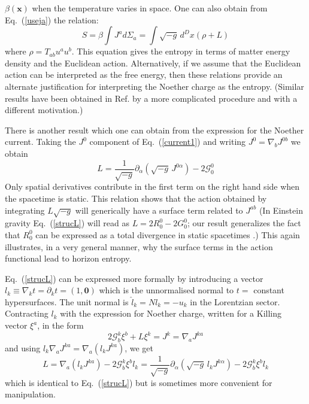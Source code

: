 \documentclass[12pt]{iopart}
\def\eq#1{{Eq.~(\ref{#1})}}
\begin{document}
$\beta (\mathbf{x})$ when the temperature varies in space. One can also obtain from \eq{useja} the  relation:
\begin{equation}
S = \beta \int J^a d \Sigma_a =  \int \sqrt{-g}\, d^Dx (\rho+L ) 
\end{equation} 
where $\rho= T_{ab} u^a u^b$.  This equation gives the entropy in terms of matter energy
density and the Euclidean action. 
Alternatively, if we assume that the Euclidean action can be interpreted as 
the free energy, then these relations  provide an alternate justification
for interpreting the Noether charge as the entropy.
(Similar results have been obtained in 
Ref. \cite{mattdbh} by a more complicated procedure and with a different motivation.)

There is another result which one can obtain from the expression for the Noether current. Taking the $J^0$ component of \eq{current1} and writing $J^0 = \nabla_b J^{0b}$
we obtain 
\begin{equation}
L = \frac{1}{\sqrt{-g}} \partial_\alpha \left( \sqrt{-g}\, J^{0\alpha}\right) - 2 \mathcal{G}^0_0
\label{strucL}
\end{equation} 
Only spatial derivatives contribute in the first term on the right hand side when the 
spacetime is static. This relation shows that the action obtained by integrating $L\sqrt{-g}$ will generically have a surface term related to $J^{ab}$ (In Einstein gravity \eq{strucL} will read as $L=2R^0_0-2G^0_0$; our result generalizes the fact that $R^0_0$ can be expressed as a total divergence in static spacetimes \cite{TPbrazil05}.) This again illustrates, in a very general manner, why the surface terms in the action functional
lead to horizon entropy. 

\eq{strucL} can be expressed more formally by introducing a vector $l_k\equiv \nabla_k t=\partial_kt=(1,\mathbf{0})$ which is the unnormalised normal to $t=$ constant hypersurfaces. The unit normal is $\hat l_k=Nl_k=-u_k$ in the Lorentzian sector. Contracting $l_k$ with the expression for Noether charge, written for a Killing vector $\xi^a$, in the form
\begin{equation}
2\mathcal{G}^k_b\xi^b+L\xi^k=J^k=\nabla_aJ^{ka}
\end{equation} 
and using 
$
l_k\nabla_aJ^{ka}=\nabla_a(l_kJ^{ka})
$, we get
\begin{equation}
L=\nabla_a(l_kJ^{ka})-2\mathcal{G}^k_b\xi^bl_k=\frac{1}{\sqrt{-g}} \partial_\alpha \left( \sqrt{-g}\, l_kJ^{k\alpha}\right)-2\mathcal{G}^k_b\xi^bl_k
\end{equation} 
which is identical to \eq{strucL} but is sometimes more convenient for manipulation.
\end{document}
